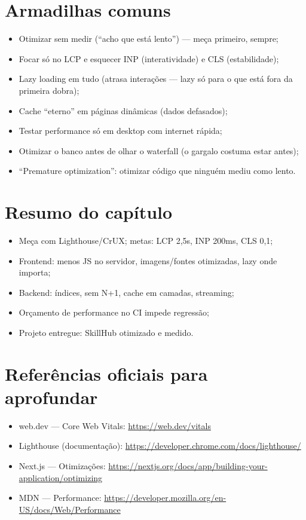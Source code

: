 \section{Armadilhas comuns}

\begin{itemize}[leftmargin=*, itemsep=0.4em]
  \item Otimizar sem medir (``acho que está lento'') — meça primeiro, sempre;
  \item Focar só no LCP e esquecer INP (interatividade) e CLS (estabilidade);
  \item Lazy loading em tudo (atrasa interações — lazy só para o que está fora da primeira dobra);
  \item Cache ``eterno'' em páginas dinâmicas (dados defasados);
  \item Testar performance só em desktop com internet rápida;
  \item Otimizar o banco antes de olhar o waterfall (o gargalo costuma estar antes);
  \item ``Premature optimization'': otimizar código que ninguém mediu como lento.
\end{itemize}

\section{Resumo do capítulo}

\begin{itemize}[leftmargin=*, itemsep=0.3em]
  \item Meça com Lighthouse/CrUX; metas: LCP 2,5s, INP 200ms, CLS 0,1;
  \item Frontend: menos JS no servidor, imagens/fontes otimizadas, lazy onde importa;
  \item Backend: índices, sem N+1, cache em camadas, streaming;
  \item Orçamento de performance no CI impede regressão;
  \item Projeto entregue: SkillHub otimizado e medido.
\end{itemize}

\section{Referências oficiais para aprofundar}

\begin{itemize}[leftmargin=*, itemsep=0.3em]
  \item web.dev — Core Web Vitals: \url{https://web.dev/vitals}
  \item Lighthouse (documentação): \url{https://developer.chrome.com/docs/lighthouse/}
  \item Next.js — Otimizações: \url{https://nextjs.org/docs/app/building-your-application/optimizing}
  \item MDN — Performance: \url{https://developer.mozilla.org/en-US/docs/Web/Performance}
\end{itemize}
